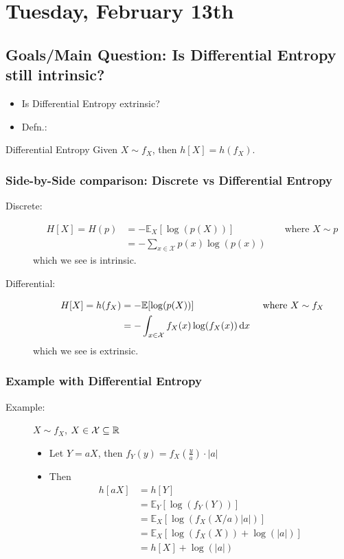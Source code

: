 \section{Tuesday, February 13th}
\subsection{Goals/Main Question: Is Differential Entropy still intrinsic?}
\begin{itemize}
    \item Is Differential Entropy extrinsic?
    \item Defn.:
\end{itemize}
\begin{defn}{Differential Entropy}
Given \( X \sim f_X \), then \( h[X] = h(f_X) \).
\end{defn}

\subsubsection{Side-by-Side comparison: Discrete vs Differential Entropy}
\begin{description}
    \item[Discrete:] 
    \begin{align*}
    H[X] = H(p) &= -\mathbb{E}_X[\log(p(X))] &&\text{ where } X \sim p \\
        &= -\sum_{x \in \mathcal{X}} p(x)\log(p(x))
    \end{align*}
    which we see is intrinsic.
    
    \item[Differential:] 
    \begin{align*}
    H[X] = h(f_X) &= -\mathbb{E}[\log(p(X))] &&\text{ where } X \sim f_X \\
        &= -\displaystyle\int_{x \in \mathcal{X}} f_X(x) \log(f_X(x)) \, \mathrm{d} x
    \end{align*}
    which we see is extrinsic.
\end{description}

\subsubsection{Example with Differential Entropy}
\begin{description}
    \item[Example:] \( X \sim f_X \), \( X \in \mathcal{X} \subseteq \mathbb{R} \)
    \begin{itemize}
        \item Let \( Y = aX \), then \( f_Y(y) = f_X\left(\frac ya\right) \cdot |a| \)
        \item Then 
        \begin{align*}
        h[aX] &= h[Y] \\
              &= \mathbb{E}_Y[\log(f_Y(Y))] \\
              &= \mathbb{E}_X[\log(f_X(X/a) |a|)] \\
              &= \mathbb{E}_X[\log(f_X(X)) + \log(|a|)] \\
              &= h[X] + \log(|a|)
        \end{align*}
    \end{itemize}
\end{description}

